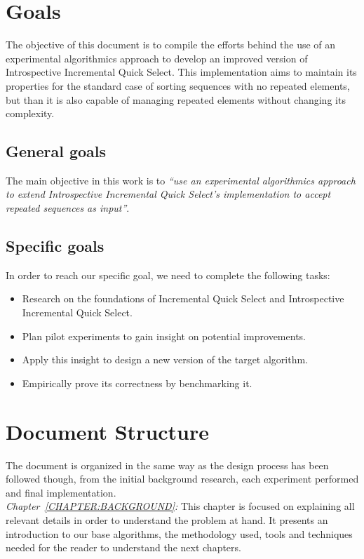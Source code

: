 \section{Goals}
The objective of this document is to compile the efforts behind the use of an experimental algorithmics approach to develop an improved version of Introspective Incremental Quick Select. This implementation aims to maintain its properties for the standard case of sorting sequences with no repeated elements, but than it is also capable of managing repeated elements without changing its complexity.\\

\subsection{General goals}
The main objective in this work is to \emph{``use an experimental algorithmics approach to extend Introspective Incremental Quick Select's implementation to accept repeated sequences as input''}.\\

\subsection{Specific goals}
In order to reach our specific goal, we need to complete the following tasks:

\begin{itemize}
    \item Research on the foundations of Incremental Quick Select and Introspective Incremental Quick Select.
    \item Plan pilot experiments to gain insight on potential improvements.
    \item Apply this insight to design a new version of the target algorithm.
    \item Empirically prove its correctness by benchmarking it. 
\end{itemize}

\section{Document Structure}
The document is organized in the same way as the design process has been followed though, from the initial background research, each experiment performed and final implementation.\\

\emph{Chapter~\ref{CHAPTER:BACKGROUND}:} This chapter is focused on explaining all relevant details in order to understand the problem at hand. It presents an introduction to our base algorithms, the methodology used, tools and techniques needed for the reader to understand the next chapters.\\

